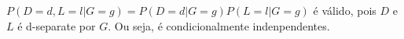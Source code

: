 $P(D = d,L = l|G = g) = P(D = d|G = g)P(L = l|G = g)$ é válido, pois $D$ e $L$ é d-separate por $G$. Ou seja, é condicionalmente indenpendentes.